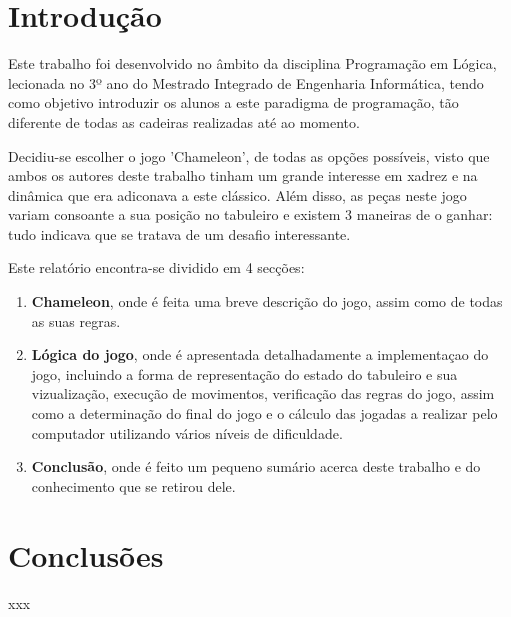 \documentclass[a4paper]{article}
\begin{document}
\tableofcontents

\newpage

\section{Introdução}

Este trabalho foi desenvolvido no âmbito da disciplina Programação em Lógica, lecionada no 3º ano do Mestrado Integrado de Engenharia Informática, tendo como objetivo introduzir os alunos a este paradigma de programação, tão diferente de todas as cadeiras realizadas até ao momento.\newline

Decidiu-se escolher o jogo 'Chameleon', de todas as opções possíveis, visto que ambos os autores deste trabalho tinham um grande interesse em xadrez e na dinâmica que era adiconava a este clássico. Além disso, as peças neste jogo variam consoante a sua posição no tabuleiro e existem 3 maneiras de o ganhar: tudo indicava que se tratava de um desafio interessante. \newline

Este relatório encontra-se dividido em 4 secções:

\begin{enumerate}
	\item \textbf{Chameleon}, onde é feita uma breve descrição do jogo, assim como de todas as suas regras.
	\item \textbf{Lógica do jogo}, onde é apresentada detalhadamente a implementaçao do jogo, incluindo a forma de representação do estado do tabuleiro e sua vizualização, execução de movimentos, verificação das regras do jogo, assim como a determinação do final do jogo e o cálculo das jogadas a realizar pelo computador utilizando vários níveis de dificuldade.
	\item \textbf{Conclusão}, onde é feito um pequeno sumário acerca deste trabalho e do conhecimento que se retirou dele.
	


\end{enumerate}
	
\newpage




\section{Conclusões}

xxx
\end{document}
